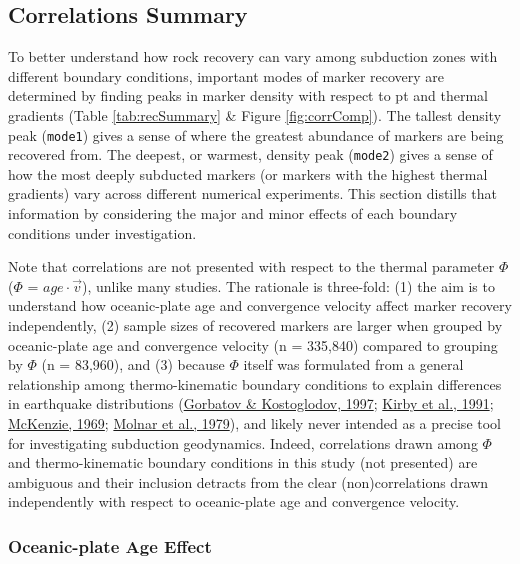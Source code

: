 \hypertarget{correlations-summary}{%
\subsection{Correlations Summary}\label{correlations-summary}}

To better understand how rock recovery can vary among subduction zones with different boundary conditions, important modes of marker recovery are determined by finding peaks in marker density with respect to \gls{pt} and thermal gradients (Table \ref{tab:recSummary} \& Figure \ref{fig:corrComp}). The tallest density peak (\texttt{mode1}) gives a sense of where the greatest abundance of markers are being recovered from. The deepest, or warmest, density peak (\texttt{mode2}) gives a sense of how the most deeply subducted markers (or markers with the highest thermal gradients) vary across different numerical experiments. This section distills that information by considering the major and minor effects of each boundary conditions under investigation.

Note that correlations are not presented with respect to the thermal parameter \(\Phi\) (\(\Phi\) = \(age \cdot \vec{v}\)), unlike many studies. The rationale is three-fold: (1) the aim is to understand how oceanic-plate age and convergence velocity affect marker recovery independently, (2) sample sizes of recovered markers are larger when grouped by oceanic-plate age and convergence velocity (n = 335,840) compared to grouping by \(\Phi\) (n = 83,960), and (3) because \(\Phi\) itself was formulated from a general relationship among thermo-kinematic boundary conditions to explain differences in earthquake distributions (\protect\hyperlink{ref-gorbatov1997}{Gorbatov \& Kostoglodov, 1997}; \protect\hyperlink{ref-kirby1991}{Kirby et al., 1991}; \protect\hyperlink{ref-mckenzie1969}{McKenzie, 1969}; \protect\hyperlink{ref-molnar1979}{Molnar et al., 1979}), and likely never intended as a precise tool for investigating subduction geodynamics. Indeed, correlations drawn among \(\Phi\) and thermo-kinematic boundary conditions in this study (not presented) are ambiguous and their inclusion detracts from the clear (non)correlations drawn independently with respect to oceanic-plate age and convergence velocity.

\hypertarget{oceanic-plate-age-effect}{%
\subsubsection{Oceanic-plate Age Effect}\label{oceanic-plate-age-effect}}

